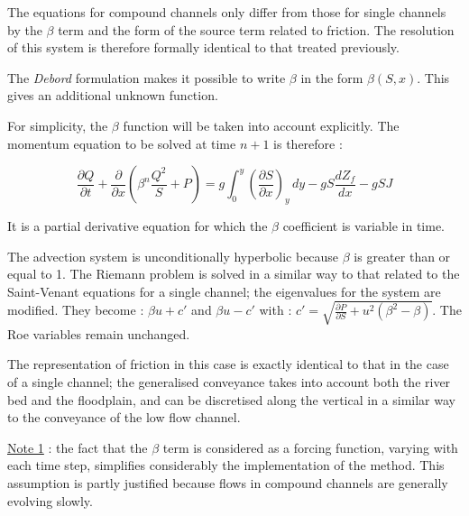 \hspace*{1cm}

The equations for compound channels only differ from those for single channels by the $\beta$ term and the form of the source term related to friction. The resolution of this system is therefore formally identical to that treated previously.

\vspace{0.5cm}

The \emph{Debord} formulation makes it possible to write $\beta$ in the form $\beta(S,x)$. This gives an additional unknown function.

\vspace{0.5cm}

For simplicity, the $\beta$ function will be taken into account explicitly. The momentum equation to be solved at time $n+1$ is therefore :

\begin{equation}
 \frac{\partial Q}{\partial t} + \frac{\partial}{\partial x} \left ( \beta^n \frac{Q^2}{S} + P \right ) = g \int_{0}^y \left ( \frac{\partial S}{\partial x} \right )_y \, dy - g S \frac{d Z_f}{dx} -g S J
\end{equation}

\vspace{0.5cm}

It is a partial derivative equation for which the $\beta$ coefficient is variable in time.

\vspace{0.5cm}

The advection system is unconditionally hyperbolic because $\beta$ is greater than or equal to 1. The Riemann problem is solved in a similar way to that related to the Saint-Venant equations for a single channel; the eigenvalues for the system are modified. They become : $\beta u + c'$ and $\beta u - c'$ with : $c' = \sqrt{\frac{\partial P}{\partial S} + u^2(\beta^2 - \beta)}$. The Roe variables remain unchanged.

\vspace{0.5cm}

The representation of friction in this case is exactly identical to that in the case of a single channel; the generalised conveyance takes into account both the river bed and the floodplain, and can be discretised along the vertical in a similar way to the conveyance of the low flow channel.

\vspace{0.5cm}

\underline{Note 1} : the fact that the $\beta$ term is considered as a forcing function, varying with each time step, simplifies considerably the implementation of the method. This assumption is partly justified because flows in compound channels are generally evolving slowly.

